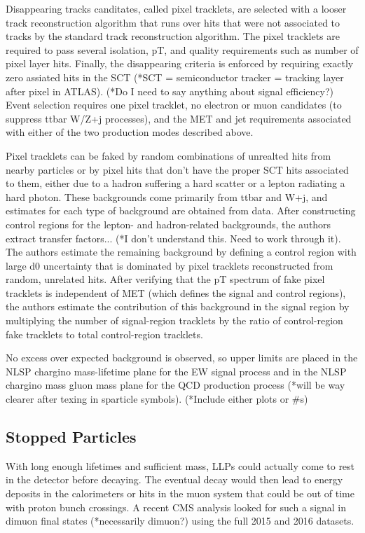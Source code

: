 \documentclass[12pt]{article}
\begin{document}
            Disappearing tracks canditates, called pixel tracklets, are selected with a looser track reconstruction algorithm that runs over hits that were not associated to tracks by the standard track reconstruction algorithm. The pixel tracklets are required to pass several isolation, pT, and quality requirements such as number of pixel layer hits. Finally, the disappearing criteria is enforced by requiring exactly zero assiated hits in the SCT (*SCT = semiconductor tracker = tracking layer after pixel in ATLAS). (*Do I need to say anything about signal efficiency?) Event selection requires one pixel tracklet, no electron or muon candidates (to suppress ttbar W/Z+j processes), and the MET and jet requirements associated with either of the two production modes described above.
            
            Pixel tracklets can be faked by random combinations of unrealted hits from nearby particles or by pixel hits that don't have the proper SCT hits associated to them, either due to a hadron suffering a hard scatter or a lepton radiating a hard photon. These backgrounds come primarily from ttbar and W+j, and estimates for each type of background are obtained from data. After constructing control regions for the lepton- and hadron-related backgrounds, the authors extract transfer factors... (*I don't understand this. Need to work through it). The authors estimate the remaining background by defining a control region with large d0 uncertainty that is dominated by pixel tracklets reconstructed from random, unrelated hits. After verifying that the pT spectrum of fake pixel tracklets is independent of MET (which defines the signal and control regions), the authors estimate the contribution of this background in the signal region by multiplying the number of signal-region tracklets by the ratio of control-region fake tracklets to total control-region tracklets.

            No excess over expected background is observed, so upper limits are placed in the NLSP chargino mass-lifetime plane for the EW signal process and in the NLSP chargino mass gluon mass plane for the QCD production process (*will be way clearer after texing in sparticle symbols). (*Include either plots or \#s)

\subsection{Stopped Particles}
            With long enough lifetimes and sufficient mass, LLPs could actually come to rest in the detector before decaying. The eventual decay would then lead to energy deposits in the calorimeters or hits in the muon system that could be out of time with proton bunch crossings. A recent CMS analysis looked for such a signal in dimuon final states (*necessarily dimuon?) using the full 2015 and 2016 datasets. 
\end{document}
